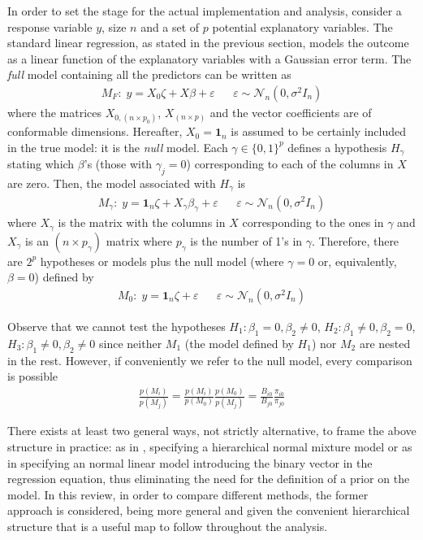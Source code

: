 \documentclass[11 pt]{article}
\begin{document}
\begin{multicols}{2}
In order to set the stage for the actual implementation and analysis, consider a response variable $y$, size $n$ and a set of $p$ potential explanatory variables. The standard linear regression, as stated in the previous section, models the outcome as a linear function of the explanatory variables with a Gaussian error term. The \textit{full} model containing all the predictors can be written as 
\begin{align*}
    M_F: \; y = X_0\zeta + X \beta + \varepsilon && \varepsilon \sim \mathcal{N}_n(0, \sigma^2I_n)
\end{align*}
where the matrices $X_{0,(n\times p_0)}$, $X_{(n\times p)}$ and the vector coefficients are of conformable dimensions. Hereafter, $X_0 = \mathbf{1}_n$ is assumed to be certainly included in the true model: it is the \textit{null} model. Each $\gamma \in \{0, 1\}^p$ defines a hypothesis $H_\gamma$ stating which $\beta$’s (those with $\gamma_j = 0$) corresponding to each of the columns in $X$ are zero. Then, the model associated with $H_\gamma$ is 
\begin{align*}
    M_\gamma: \; y = \mathbf{1}_n\zeta + X_\gamma \beta_\gamma + \varepsilon && \varepsilon \sim \mathcal{N}_n(0, \sigma^2I_n)
\end{align*}
where $X_\gamma$ is the matrix with the columns in $X$ corresponding to the ones in $\gamma$ and $X_\gamma$ is an $(n \times p_\gamma)$ matrix where $p_\gamma$ is the number of 1’s in $\gamma$. Therefore, there are $2^p$ hypotheses or models plus the null model (where $\gamma = 0$ or, equivalently, $\beta = 0$) defined by
\begin{align*}
    M_0: \; y = \mathbf{1}_n\zeta + \varepsilon && \varepsilon \sim \mathcal{N}_n(0, \sigma^2I_n)
\end{align*}

Observe that we cannot test the hypotheses $H_1: \beta_1 = 0, \beta_2 \neq 0$, $H_2: \beta_1 \neq 0, \beta_2 = 0$, $H_3: \beta_1 \neq 0, \beta_2 \neq 0$ since neither $M_1$ (the model defined by $H_1$) nor $M_2$ are nested in the rest.  However, if conveniently we refer to the null model, every comparison is possible
\begin{align*}
    \frac{p(M_i)}{p(M_j)} = \frac{p(M_i)}{p(M_0)}\frac{p(M_0)}{p(M_j)} = \frac{B_{i0}}{B_{j0}}\frac{\pi_{i0}}{\pi_{j0}}
\end{align*}

 There exists at least two general ways, not strictly alternative, to frame the above structure in practice: as in \cite{George1993}, specifying a hierarchical normal mixture model or as in \cite{Kuo1998} specifying an  normal linear model introducing the binary vector in the regression equation, thus eliminating the need for the definition of a prior on the model. In this review, in order to compare different methods, the former approach is considered, being more general and given the convenient hierarchical structure that is a useful map to follow throughout the analysis. 


\end{multicols}
\end{document}
